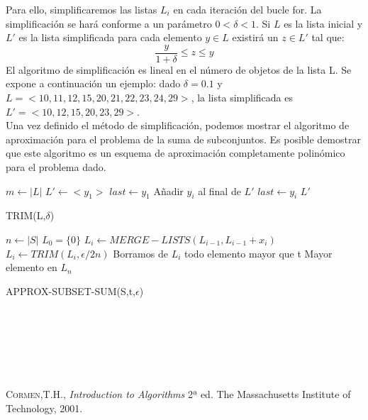 \documentclass{article}
\begin{document}
Para ello, simplificaremos las listas $L_i$ en cada iteración del bucle for. La simplificación se hará conforme a un parámetro $0 < \delta < 1$. Si $L$ es la lista inicial y $L'$ es la lista simplificada para cada elemento $y \in L$ existirá un $z \in L'$ tal que:
\[
\frac{y}{1 + \delta} \leq z \leq y
\]
El algoritmo de simplificación es lineal en el número de objetos de la lista L. Se expone a continuación un ejemplo: dado $\delta = 0.1$ y $L = <10, 11, 12 ,15, 20, 21, 22, 23, 24, 29>$, la lista simplificada es $L' = <10, 12, 15, 20, 23, 29>$.\\

Una vez definido el método de simplificación, podemos mostrar el algoritmo de aproximación para el problema de la suma de subconjuntos. Es posible demostrar que este algoritmo es un esquema de aproximación completamente polinómico para el problema dado.\\

\begin{algorithm}[H]
\begin{algorithmic}[1]
\STATE $m \gets |L|$
\STATE $L' \gets <y_1>$
\STATE $last \gets y_1$
\STATE Añadir $y_i$ al final de $L'$
\STATE $last \gets y_i$
\ENDIF
\ENDFOR
\RETURN $L'$
\end{algorithmic}
\caption{TRIM(L,$\delta$)}
\end{algorithm}

\begin{algorithm}[H]
\begin{algorithmic}[1]
\STATE $n \gets |S|$
\STATE	 $L_0 = \{0\} $
\STATE $L_i \gets MERGE-LISTS(L_{i-1}, L_{i-1} + x_i)$
\STATE $L_i \gets TRIM(L_i, \epsilon/2n)$
\STATE Borramos de $L_i$ todo elemento mayor que t
\ENDFOR
\RETURN Mayor elemento en $L_n$
\end{algorithmic}
\caption{APPROX-SUBSET-SUM(S,t,$\epsilon$)}
\end{algorithm}

\\
\\
\\
\\
\\
\begin{thebibliography}{x}
 \textsc{Cormen,T.H.},
\textit{Introduction to Algorithms}
2ª ed. The Massachusetts Institute of Technology, 2001. 

\end{thebibliography}
\end{document}
